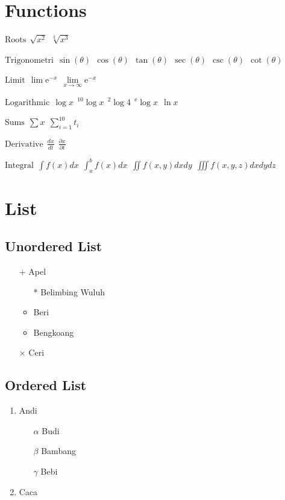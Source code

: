 \documentclass{article}
\begin{document}
    \newpage
    \section{Functions}

    $\textrm{Roots} \: \: \sqrt{x^2} \: \: 
    \sqrt[3]{x^3}
    $

    $\textrm{Trigonometri} \: \:
    \sin(\theta) \: \: 
    \cos(\theta) \: \: 
    \tan(\theta) \: \: 
    \sec(\theta) \: \:
    \csc(\theta) \: \:
    \cot(\theta) \: \:
    $

    $\textrm{Limit} \: \:
    \lim \textrm{e}^{-x} \: \:
    \lim\limits_{x \to \infty} \textrm{e}^{-x}
    $

    $\textrm{Logarithmic} \: \:
    \log{x} \: \: 
    ^{10} \log{x} \: \:
    ^{2} \log {4} \: \:
    ^{\textrm{e}} \log {x} \: \:
    \ln {x}
    $

    $\textrm{Sums} \: \:
    \sum x \: \:
    \sum_{i=1}^{10} t_i
    $

    $\textrm{Derivative} \: \:
    \frac{dx}{dt} \: \:
    \frac{\partial x}{\partial t}
    $

    $\textrm{Integral} \: \:
    \int f(x) dx \: \:
    \int_a^b f(x) dx \: \:
    \iint f(x, y) dx dy \: \:
    \iiint f(x, y, z) dx dy dz \: \:
    $


    \section{List}
    
    \subsection{Unordered List}
    \begin{itemize}
        \item[+] Apel
        \begin{itemize}
            \item[*] Belimbing Wuluh
            \item Beri
            \item Bengkoang
        \end{itemize}
        \item[$\times$] Ceri
    \end{itemize}

    \subsection{Ordered List}
    \begin{enumerate}
        \item Andi
        \begin{enumerate}
            \item[$\alpha$] Budi
            \item[$\beta$] Bambang
            \item[$\gamma$] Bebi
        \end{enumerate}
        \item Caca
    \end{enumerate}
\end{document}
